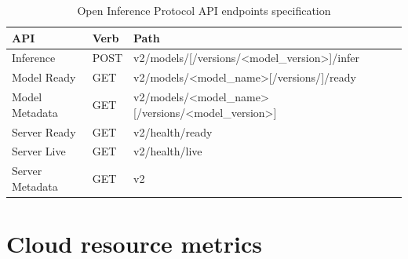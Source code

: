 \begin{table}[t]
\centering
\begin{tabular}{|l|l|l|}
\hline
\textbf{API}    & \textbf{Verb} & \textbf{Path}                                                                                         \\ \hline
Inference       & POST          & v2/models/{[}/versions/\textless{}model\_version\textgreater{}{]}/infer                               \\ \hline
Model Ready     & GET           & v2/models/\textless{}model\_name\textgreater{}{[}/versions/{]}/ready                                  \\ \hline
Model Metadata  & GET           & v2/models/\textless{}model\_name\textgreater{}{[}/versions/\textless{}model\_version\textgreater{}{]} \\ \hline
Server Ready    & GET           & v2/health/ready                                                                                       \\ \hline
Server Live     & GET           & v2/health/live                                                                                        \\ \hline
Server Metadata & GET           & v2                                                                                                    \\ \hline
\end{tabular}
\caption{Open Inference Protocol API endpoints specification \cite{kserve_oip}}
\label{tab:oip_endpoints}
\end{table}

\section{Cloud resource metrics}


